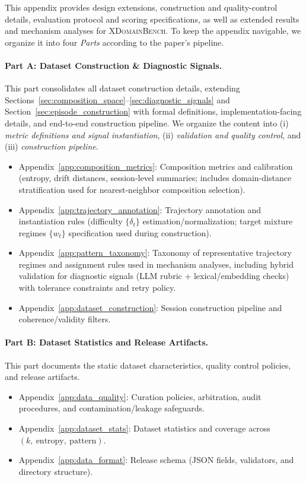 \newpage
\appendix
\onecolumn

\label{app:overview}

This appendix provides design extensions, construction and quality-control details, evaluation protocol and scoring specifications, as well as extended results and mechanism analyses for \textsc{XDomainBench}.
To keep the appendix navigable, we organize it into four \emph{Parts} according to the paper's pipeline.

\paragraph{Part A: Dataset Construction \& Diagnostic Signals.}
This part consolidates all dataset construction details, extending Sections~\ref{sec:composition_space}--\ref{sec:diagnostic_signals} and Section~\ref{sec:episode_construction} with formal definitions, implementation-facing details, and end-to-end construction pipeline.
We organize the content into (i) \emph{metric definitions and signal instantiation}, (ii) \emph{validation and quality control}, and (iii) \emph{construction pipeline}.
\begin{itemize}
    \item Appendix~\ref{app:composition_metrics}: Composition metrics and calibration (entropy, drift distances, session-level summaries; includes domain-distance stratification used for nearest-neighbor composition selection).
    \item Appendix~\ref{app:trajectory_annotation}: Trajectory annotation and instantiation rules (difficulty $\{\delta_t\}$ estimation/normalization; target mixture regimes $\{w_t\}$ specification used during construction).
    \item Appendix~\ref{app:pattern_taxonomy}: Taxonomy of representative trajectory regimes and assignment rules used in mechanism analyses, including hybrid validation for diagnostic signals (LLM rubric + lexical/embedding checks) with tolerance constraints and retry policy.
    \item Appendix~\ref{app:dataset_construction}: Session construction pipeline and coherence/validity filters.
\end{itemize}

\paragraph{Part B: Dataset Statistics and Release Artifacts.}
This part documents the static dataset characteristics, quality control policies, and release artifacts.
\begin{itemize}
    \item Appendix~\ref{app:data_quality}: Curation policies, arbitration, audit procedures, and contamination/leakage safeguards.
    \item Appendix~\ref{app:dataset_stats}: Dataset statistics and coverage across $(k,\ \text{entropy},\ \text{pattern})$.
    \item Appendix~\ref{app:data_format}: Release schema (JSON fields, validators, and directory structure).
\end{itemize}


